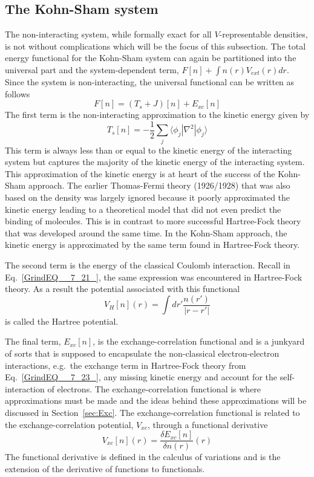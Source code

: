 \documentclass[11pt,oneside,final]{huthesis}%
\begin{document}
\subsection{The Kohn-Sham system}
The non-interacting system, while formally exact for all $V$-representable densities, is not without complications which will be the focus of this subsection.  The total energy functional for the Kohn-Sham system can again be partitioned into the universal part and the system-dependent term, $F[n]+\int n(r) V_{ext}(r)dr$.  Since the system is non-interacting, the universal functional can be written as follows
\begin{equation}
F[n]=(T_s+J)[n]+E_{xc}[n]
\end{equation}
The first term is the non-interacting approximation to the kinetic energy given by
\[T_s[n]=-\frac{1}{2}\sum_j\langle\phi_j|\nabla^2|\phi_j\rangle\]
This term is always less than or equal to the kinetic energy of the interacting system but captures the majority of the kinetic energy of the interacting system.  This approximation of the kinetic energy is at heart of the success of the Kohn-Sham approach.  The earlier Thomas-Fermi theory (1926/1928) that was also based on the density was largely ignored because it poorly approximated the kinetic energy leading to a theoretical model that did not even predict the binding of molecules.  This is in contrast to more successful Hartree-Fock theory that was developed around the same time.  In the Kohn-Sham approach, the kinetic energy is approximated by the same term found in Hartree-Fock theory.

The second term is the energy of the classical Coulomb interaction.  Recall in Eq.~\eqref{GrindEQ__7_21_}, the same expression was encountered in Hartree-Fock theory. As a result the potential associated with this functional
\begin{equation}\label{eq:vH}
V_{H}[n](r)=\int dr' \frac{n(r')}{|r-r'|}
\end{equation}
is called the {Hartree potential}.

The final term, $E_{xc}[n]$, is the exchange-correlation functional and is a junkyard of sorts that is supposed to encapsulate the non-classical electron-electron interactions, e.g.~the exchange term in Hartree-Fock theory from Eq.~\eqref{GrindEQ__7_23_}, any missing kinetic energy and account for the self-interaction of electrons.  The exchange-correlation functional is where approximations must be made and the ideas behind these approximations will be discussed in Section~\ref{sec:Exc}.  The exchange-correlation functional is related to the exchange-correlation potential, $V_{xc}$, through a functional derivative
\begin{equation}\label{eq:vXC}
V_{xc}[n](r)=\frac{\delta E_{xc}[n]}{\delta n(r)}(r)
\end{equation}
The functional derivative is defined in the calculus of variations and is the extension of the derivative of functions to functionals.
\end{document}

